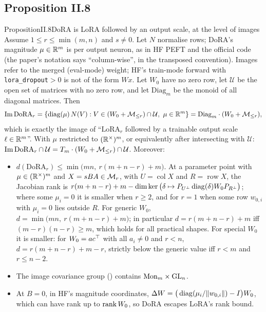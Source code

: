 \subsection{Proposition II.8}\label{proof:II.8}

\begin{restate}{Proposition}{II.8}{DoRA is LoRA followed by an output scale, at the level of images}
Assume $1\le r\le\min(m,n)$ and $s\ne0$. Let $N$ normalise rows; DoRA's magnitude $\mu\in\mathbb{R}^m$ is per output neuron, as
in HF PEFT and the official code (the paper's notation says ``column-wise'', in the transposed convention). Images refer
to the merged (eval-mode) weight; HF's train-mode forward with \texttt{lora\_dropout}${}>0$ is not of the form $Wx$. Let
$W_0$ have no zero row, let $\mathcal U$ be the open set of matrices with no zero row, and let $\mathrm{Diag}_m$ be the
monoid of all diagonal matrices. Then
\begin{equation*}
  \operatorname{Im}\mathrm{DoRA}_r=\{\operatorname{diag}(\mu)\,N(V):V\in(W_0+\mathcal{M}_{\le r})\cap\mathcal U,\ \mu\in\mathbb{R}^m\}=\mathrm{Diag}_m\cdot(W_0+\mathcal{M}_{\le r}),
\end{equation*}
which is exactly the image of ``$\mathrm{LoRA}_r$ followed by a trainable output scale $\ell\in\mathbb{R}^m$''. With $\mu$
restricted to $(\mathbb{R}^\times)^m$, or equivalently after intersecting with $\mathcal U$:
$\operatorname{Im}\mathrm{DoRA}_r\cap\mathcal U=T_m\cdot(W_0+\mathcal{M}_{\le r})\cap\mathcal U$. Moreover:
\begin{itemize}
  \item $d(\mathrm{DoRA}_r)\le\min\big(mn,\ r(m+n-r)+m\big)$. At a parameter point with $\mu\in(\mathbb{R}^\times)^m$ and
    $X=sBA\in\mathcal{M}_r$, with $U=\operatorname{col}X$ and $R=\operatorname{row}X$, the Jacobian rank is
    $r(m+n-r)+m-\dim\ker\big(\delta\mapsto P_{U^\perp}\operatorname{diag}(\delta)W_0P_{R^\perp}\big)$; where some $\mu_i=0$ it is
    smaller when $r\ge2$, and for $r=1$ when some row $w_{0,i}$ with $\mu_i=0$ lies outside $R$. For generic $W_0$, $d=\min\big(mn,\ r(m+n-r)+m\big)$; in particular $d=r(m+n-r)+m$ iff
    $(m-r)(n-r)\ge m$, which holds for all practical shapes. For special $W_0$ it is smaller: for $W_0=ac^{\top}$ with all
    $a_i\ne0$ and $r<n$, $d=r(m+n-r)+m-r$, strictly below the generic value iff $r<m$ and $r\le n-2$.
  \item The image covariance group () contains $\mathrm{Mon}_m\times\mathrm{GL}_n$.
  \item At $B=0$, in HF's magnitude coordinates, $\Delta W=\big(\operatorname{diag}(\mu_i/\lVert w_{0,i}\rVert)-I\big)W_0$, which can
    have rank up to $\operatorname{rank} W_0$, so DoRA escapes LoRA's rank bound.
\end{itemize}
\end{restate}

